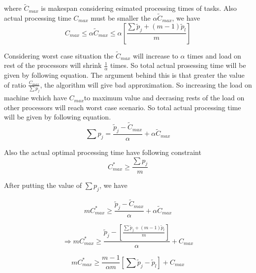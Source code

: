 \documentclass[10pt, conference, compsocconf]{IEEEtran}
\begin{document}
where $\tilde C_{max}$ is makespan considering esimated processing  times  of tasks.  Also actual processing time  $C_{max}$ must be smaller the $\alpha\tilde C_{max}$, we have \\

\begin{equation}
 C_{max}\leq \alpha \tilde C_{max}\leq \alpha [\frac{\sum{\tilde p_j + (m-1) \tilde p_l} }{m}] 
\end{equation} 

Considering worst case situation the $\tilde C_{max}$ will increase to $\alpha$ times and load on rest of the processors will shrink  $\frac{1}{\alpha}$ times. So total actual prosessing time will be given by following equation.  The argument behind this is that greater the value of ratio $\frac{C_{max}}{\sum{p_j}}$, the algorithm will give bad approximation. So increasing the load on machine wchich have $C_{max} $to maximum
value and decrasing rests of the load on other processors will reach worst case scenario. So total actual processing time will be given by following equation.
 \begin{equation}
 \sum {p_j} = \frac{\tilde p_j- \tilde C_{max}}{\alpha} + \alpha \tilde C_{max}
 \end{equation}
 
 Also the actual optimal processing time have following constraint
 \begin{equation}\nonumber 
C_{max}^{*}\geq \frac{\sum {p_j}}{m}
\end{equation}

After putting the value of  $ \sum {p_j}$, we have

 \begin{equation}\nonumber 
 m C_{max}^{*}\geq \frac{\tilde p_j- \tilde C_{max}}{\alpha} + \alpha \tilde C_{max}
 \end{equation}
 
\begin{equation}\nonumber 
\Rightarrow m C_{max}^{*}\geq \frac{\tilde p_j-[\frac{\sum{\tilde p_j + (m-1) \tilde p_l }}{m}]} {\alpha} + {C_{max}}
\end{equation}

\begin{equation}\nonumber
 m C_{max}^{*}\geq \frac{m-1}{\alpha m} [\sum \tilde p_j-\tilde p_l] + {C_{max}}
 \end{equation}
\end{document}
